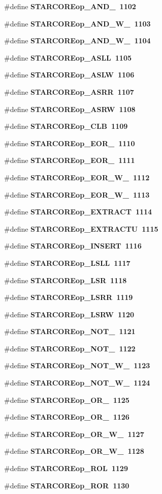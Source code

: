 \begin{CompactItemize}
\item 
\#define \bf{STARCOREop\_\-AND\_}~1102
\item 
\#define \bf{STARCOREop\_\-AND\_\-W\_}~1103
\item 
\#define \bf{STARCOREop\_\-AND\_\-W\_}~1104
\item 
\#define \bf{STARCOREop\_\-ASLL}~1105
\item 
\#define \bf{STARCOREop\_\-ASLW}~1106
\item 
\#define \bf{STARCOREop\_\-ASRR}~1107
\item 
\#define \bf{STARCOREop\_\-ASRW}~1108
\item 
\#define \bf{STARCOREop\_\-CLB}~1109
\item 
\#define \bf{STARCOREop\_\-EOR\_}~1110
\item 
\#define \bf{STARCOREop\_\-EOR\_}~1111
\item 
\#define \bf{STARCOREop\_\-EOR\_\-W\_}~1112
\item 
\#define \bf{STARCOREop\_\-EOR\_\-W\_}~1113
\item 
\#define \bf{STARCOREop\_\-EXTRACT}~1114
\item 
\#define \bf{STARCOREop\_\-EXTRACTU}~1115
\item 
\#define \bf{STARCOREop\_\-INSERT}~1116
\item 
\#define \bf{STARCOREop\_\-LSLL}~1117
\item 
\#define \bf{STARCOREop\_\-LSR}~1118
\item 
\#define \bf{STARCOREop\_\-LSRR}~1119
\item 
\#define \bf{STARCOREop\_\-LSRW}~1120
\item 
\#define \bf{STARCOREop\_\-NOT\_}~1121
\item 
\#define \bf{STARCOREop\_\-NOT\_}~1122
\item 
\#define \bf{STARCOREop\_\-NOT\_\-W\_}~1123
\item 
\#define \bf{STARCOREop\_\-NOT\_\-W\_}~1124
\item 
\#define \bf{STARCOREop\_\-OR\_}~1125
\item 
\#define \bf{STARCOREop\_\-OR\_}~1126
\item 
\#define \bf{STARCOREop\_\-OR\_\-W\_}~1127
\item 
\#define \bf{STARCOREop\_\-OR\_\-W\_}~1128
\item 
\#define \bf{STARCOREop\_\-ROL}~1129
\item 
\#define \bf{STARCOREop\_\-ROR}~1130
\item 

\end{CompactItemize}
